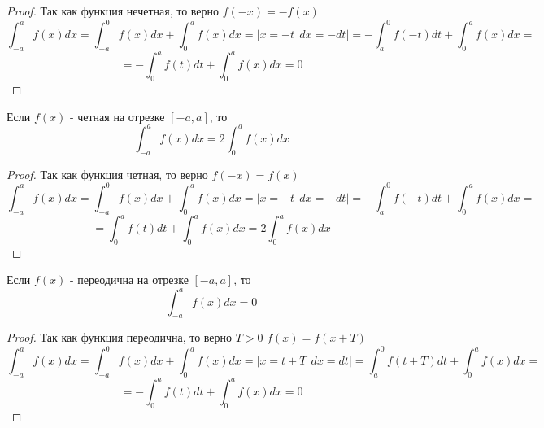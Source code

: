 \begin{proof}
  Так как функция нечетная, то верно $f(-x) = -f(x)$
  \[\int^a_{-a} f(x)dx = \int^0_{-a} f(x)dx + \int^a_0 f(x)dx =
    |x = -t ~~ dx = -dt| = -\int^0_a f(-t)dt + \int^a_0 f(x)dx =\]
    \[= -\int^a_0 f(t)dt + \int^a_0 f(x)dx = 0\]
\end{proof}

\begin{theorem}
  Если $f(x)$ - четная на отрезке $[-a, a]$, то
  \[\int^a_{-a} f(x)dx = 2\int^a_{0} f(x)dx \]
\end{theorem}

\begin{proof}
  Так как функция четная, то верно $f(-x) = f(x)$
  \[\int^a_{-a} f(x)dx = \int^0_{-a} f(x)dx + \int^a_0 f(x)dx =
    |x = -t ~~ dx = -dt| = -\int^0_a f(-t)dt + \int^a_0 f(x)dx =\]
    \[= \int^a_0 f(t)dt + \int^a_0 f(x)dx = 2\int^a_{0} f(x)dx\]
\end{proof}

\begin{theorem}
  Если $f(x)$ - переодична на отрезке $[-a, a]$, то
  \[\int^a_{-a} f(x)dx = 0\]
\end{theorem}

\begin{proof}
  Так как функция переодична, то верно $T>0$ $f(x) = f(x+T)$
  \[\int^a_{-a} f(x)dx = \int^0_{-a} f(x)dx + \int^a_0 f(x)dx =
    |x = t+T ~~ dx = dt| = \int^0_a f(t+T)dt + \int^a_0 f(x)dx =\]
    \[= -\int^a_0 f(t)dt + \int^a_0 f(x)dx = 0\]
\end{proof}